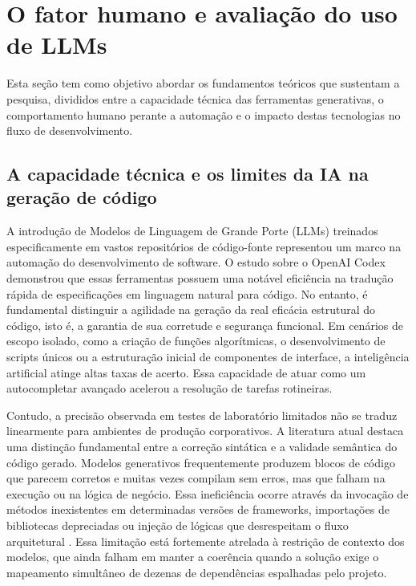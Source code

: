 \chapter{O fator humano e avaliação do uso de LLMs}

Esta seção tem como objetivo abordar os fundamentos teóricos que 
sustentam a pesquisa, divididos entre a capacidade técnica das ferramentas 
generativas, o comportamento humano perante a automação e o impacto destas 
tecnologias no fluxo de desenvolvimento. 

\section{A capacidade técnica e os limites da IA na geração de código} 

A introdução de Modelos de Linguagem de Grande Porte (LLMs) treinados 
especificamente em vastos repositórios de código-fonte representou um marco na 
automação do desenvolvimento de software. O estudo sobre o OpenAI Codex 
\cite{chen2021} demonstrou que essas ferramentas possuem uma notável 
eficiência na tradução rápida de especificações em linguagem natural para código. 
No entanto, é fundamental distinguir a agilidade na geração da real eficácia 
estrutural do código, isto é, a garantia de sua corretude e segurança funcional. Em 
cenários de escopo isolado, como a criação de funções algorítmicas, o 
desenvolvimento de scripts únicos ou a estruturação inicial de componentes de 
interface, a inteligência artificial atinge altas taxas de acerto. Essa capacidade de 
atuar como um autocompletar avançado acelerou a resolução de tarefas rotineiras.

Contudo, a precisão observada em testes de laboratório limitados não se 
traduz linearmente para ambientes de produção corporativos. A literatura atual 
destaca uma distinção fundamental entre a correção sintática e a validade semântica 
do código gerado. Modelos generativos frequentemente produzem blocos de código 
que parecem corretos e muitas vezes compilam sem erros, mas que falham na 
execução ou na lógica de negócio. Essa ineficiência ocorre através da invocação de 
métodos inexistentes em determinadas versões de frameworks, importações de 
bibliotecas depreciadas ou injeção de lógicas que desrespeitam o fluxo arquitetural 
\cite{liu2023}. Essa limitação está fortemente atrelada à restrição de contexto 
dos modelos, que ainda falham em manter a coerência quando a solução exige o 
mapeamento simultâneo de dezenas de dependências espalhadas pelo projeto.

